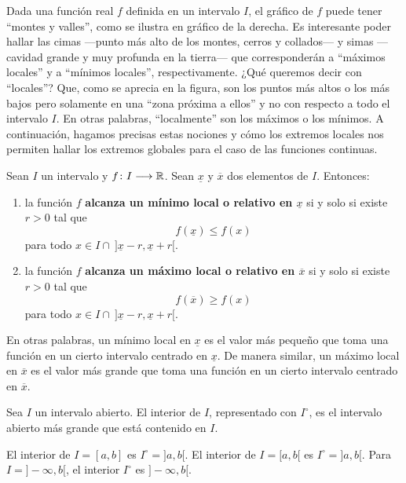 Dada una función real $f$ definida en un intervalo $I$, el gráfico de $f$ puede tener ``montes y
valles'', como se ilustra en gráfico de la derecha. Es interesante poder hallar las cimas ---punto
más alto de los montes, cerros y collados--- y simas ---cavidad grande y muy profunda en la
tierra--- que corresponderán a ``máximos locales'' y a ``mínimos locales'', respectivamente. ¿Qué
queremos decir con ``locales''? Que, como se aprecia en la figura, son los puntos más altos o los
más bajos pero solamente en una ``zona próxima a ellos'' y no con respecto a todo el intervalo $I$.
En otras palabras, ``localmente'' son los máximos o los mínimos. A continuación, hagamos precisas
estas nociones y cómo los extremos locales nos permiten hallar los extremos globales para el caso
de las funciones continuas.

\begin{defical}
Sean $I$ un intervalo y $f\colon I\longrightarrow \mathbb{R}$. Sean $\underline{x}$ y $\overline{x}$ dos elementos
de $I$. Entonces:
\begin{enumerate}
\item la función $f$ \textbf{alcanza un mínimo local o relativo en $\underline{x}$} si y solo
    si existe $r > 0$ tal que
    \[
    f(\underline{x}) \leq f(x)
    \]
    para todo $x \in I \cap \ ]\underline{x} - r, \underline{x} + r[$.

\item la función $f$ \textbf{alcanza un máximo local o relativo en $\overline{x}$} si y solo si
    existe $r > 0$ tal que
    \[
    f(\overline{x}) \geq f(x)
    \]
    para todo $x \in I \cap \ ]\underline{x} - r, \underline{x} + r[$.
\end{enumerate}
\end{defical}

En otras palabras, un mínimo local en $\underline{x}$ es el valor más pequeño que toma una función
en un cierto intervalo centrado en $\underline{x}$. De manera similar, un máximo local en
$\overline{x}$ es el valor más grande que toma una función en un cierto intervalo centrado en
$\overline{x}$.

\begin{defical}
Sea $I$ un intervalo abierto. El interior de $I$, representado con $I^\circ$, es el intervalo
abierto más grande que está contenido en $I$.
\end{defical}

\begin{exemplo}[]{}
El interior de $I = [a,b]$ es $I^\circ = ]a,b[$. El interior de $I = [a,b[$ es $I^\circ = ]a,b[$.
Para $I = ]-\infty,b[$, el interior $I^\circ$ es $]-\infty, b[$.
\end{exemplo}

